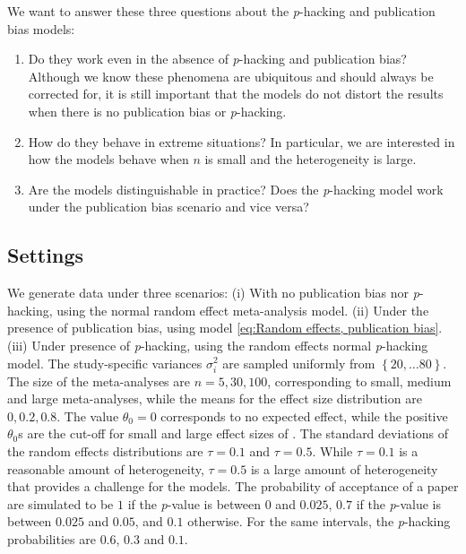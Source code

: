 \documentclass{article}
\theoremstyle{plain}
\theoremstyle{definition}
\begin{document}
%
%
We want to answer these three questions about the \textit{p}-hacking and publication bias models:
\begin{enumerate}[label=\roman*]
\item Do they work even in the absence of \textit{p}-hacking and publication bias? Although we know these phenomena are ubiquitous and should always be corrected for, it is still important that the models do not distort the results when there is no publication bias or \textit{p}-hacking.
\item How do they behave in extreme situations? In particular, we are interested in how the models behave when $n$ is small and the heterogeneity is large.
\item Are the models distinguishable in practice? Does the \textit{p}-hacking model work under the publication bias scenario and vice versa?
\end{enumerate}

\subsection{Settings}
We generate data under three scenarios: (i) With no publication bias nor \textit{p}-hacking, using the normal random effect meta-analysis model. (ii) Under the presence of publication bias, using model \eqref{eq:Random effects, publication bias}. (iii) Under presence of \textit{p}-hacking, using the random effects normal \textit{p}-hacking model. The study-specific variances $\sigma_{i}^{2}$ are sampled uniformly from $\left\{ 20,\ldots80\right\} $. The size of the meta-analyses are $n = 5, 30, 100$, corresponding to small, medium and large meta-analyses, while the means for the effect size distribution are $0, 0.2, 0.8$. The value $\theta_0 = 0$ corresponds to no expected effect, while the positive $\theta_0$s are the cut-off for small and large effect sizes of \citet[][pages 24 -- 27]{cohen1988statistical}. The standard deviations of the random effects distributions are $\tau=0.1$ and $\tau=0.5$. While $\tau = 0.1$ is a reasonable amount of heterogeneity, $\tau=0.5$ is a large amount of heterogeneity that provides a challenge for the models. The probability of acceptance of a paper are simulated to be $1$ if the \textit{p}-value is between $0$ and $0.025$, $0.7$ if the \textit{p}-value is between $0.025$ and $0.05$, and $0.1$ otherwise. For the same intervals, the \textit{p}-hacking probabilities are $0.6$, $0.3$ and $0.1$. 
\end{document}
